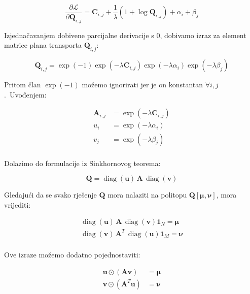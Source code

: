\documentclass[diplomskirad]{fer}
\begin{document}
\begin{equation}
  \frac{\partial \mathcal{L}}{\partial \bm{Q}_{i,j}} = \bm{C}_{i,j} + \frac{1}{\lambda} (1 + \log \bm{Q}_{i,j}) + \alpha_{i} + \beta_{j}
  \label{eq:sk_deriv}
\end{equation}

Izjednačavanjem dobivene parcijalne derivacije s $0$, dobivamo izraz za element matrice plana transporta $\bm{Q}_{i,j}$:

\begin{equation}
  \bm{Q}_{i,j} = \exp(-1) \exp(-\lambda \bm{C}_{i,j}) \exp(-\lambda \alpha_{i}) \exp(-\lambda \beta_{j})
  \label{eq:sk_one_el}
\end{equation}

Pritom član $\exp(-1)$ možemo ignorirati jer je on konstantan $\forall i,j$.\ Uvođenjem:

\begin{equation}
  \begin{aligned}
    \bm{A}_{i,j} &= \exp(-\lambda \bm{C}_{i,j}) \\
    u_{i} &= \exp(-\lambda \alpha_{i}) \\
    v_{j} &= \exp(-\lambda \beta_{j}) \\
  \end{aligned}
  \label{eq:sk_alias}
\end{equation}

Dolazimo do formulacije iz Sinkhornovog teorema:

\begin{equation}
  \bm{Q} = \operatorname{diag}(\bm{u})\,\bm{A}\,\operatorname{diag}(\bm{v})
  \label{eq:sk_q_formula}
\end{equation}

Gledajući da se svako rješenje $\bm{Q}$ mora nalaziti na politopu $\bm{Q}\left[ \bm{\mu}, \bm{\nu} \right]$, mora vrijediti:

\begin{equation}
  \begin{aligned}
    \operatorname{diag}(\bm{u})\,\bm{A}\,\operatorname{diag}(\bm{v}) \bm{1}_N = \bm{\mu} \\
    \operatorname{diag}(\bm{v})\,\bm{A}^T\,\operatorname{diag}(\bm{u}) \bm{1}_M = \bm{\nu} \\
  \end{aligned}
  \label{eq:sk_conditions}
\end{equation}

Ove izraze možemo dodatno pojednostaviti:

\begin{equation}
  \begin{aligned}
    \bm{u} \odot (\bm{A} \bm{v}) &= \bm{\mu} \\
    \bm{v} \odot (\bm{A}^T \bm{u}) &= \bm{\nu} \\
  \end{aligned}
  \label{eq:sk_conditions_simplified}
\end{equation}
\end{document}

